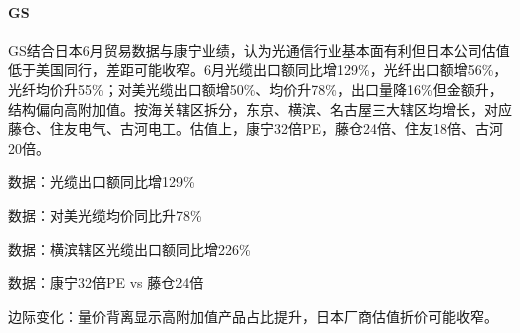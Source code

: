 \documentclass[11pt]{ctexart}
\begin{document}
\paragraph{GS} GS结合日本6月贸易数据与康宁业绩，认为光通信行业基本面有利但日本公司估值低于美国同行，差距可能收窄。6月光缆出口额同比增129\%，光纤出口额增56\%，光纤均价升55\%；对美光缆出口额增50\%、均价升78\%，出口量降16\%但金额升，结构偏向高附加值。按海关辖区拆分，东京、横滨、名古屋三大辖区均增长，对应藤仓、住友电气、古河电工。估值上，康宁32倍PE，藤仓24倍、住友18倍、古河20倍。
{\small\color{refgray}数据：光缆出口额同比增129\%\par}
{\small\color{refgray}数据：对美光缆均价同比升78\%\par}
{\small\color{refgray}数据：横滨辖区光缆出口额同比增226\%\par}
{\small\color{refgray}数据：康宁32倍PE vs 藤仓24倍\par}
{\small\color{refgray}边际变化：量价背离显示高附加值产品占比提升，日本厂商估值折价可能收窄。\par}
\end{document}
